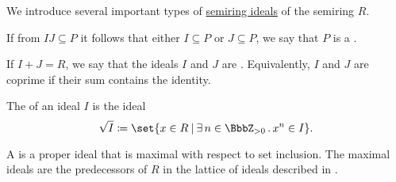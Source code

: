 \begin{definition}\label{def:derived_semiring_ideals}
  We introduce several important types of \hyperref[def:semiring_ideal]{semiring ideals} of the semiring \( R \).

  \begin{thmenum}
     If from \( IJ \subseteq P \) it follows that either \( I \subseteq P \) or \( J \subseteq P \), we say that \( P \) is a .

     If \( I + J = R \), we say that the ideals \( I \) and \( J \) are . Equivalently, \( I \) and \( J \) are coprime if their sum contains the identity.

     The  of an ideal \( I \) is the ideal
    \begin{equation*}
      \sqrt I \coloneqq \set{ x \in R \given \qexists {n \in \BbbZ_{>0}} x^n \in I }.
    \end{equation*}

     A  is a proper ideal that is maximal with respect to set inclusion. The maximal ideals are the predecessors of \( R \) in the lattice of ideals described in .
  \end{thmenum}
\end{definition}

